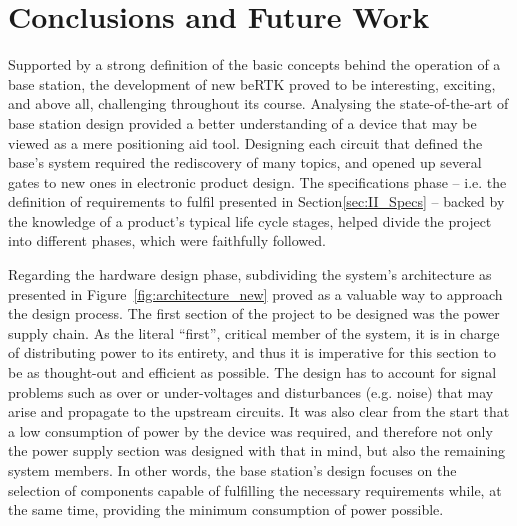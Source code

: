 

\chapter{Conclusions and Future Work}\label{cha:chapter6_ConclusionsFuture}


Supported by a strong definition of the basic concepts behind the operation of a base station, the development of new beRTK\textsuperscript{\textregistered} proved to be interesting, exciting, and above all, challenging throughout its course. Analysing the state-of-the-art of base station design provided a better understanding of a device that may be viewed as a mere positioning aid tool. Designing each circuit that defined the base's system required the rediscovery of many topics, and opened up several gates to new ones in electronic product design. The specifications phase -- i.e. the definition of requirements to fulfil presented in Section\ref{sec:II_Specs} -- backed by the knowledge of a product's typical life cycle stages, helped divide the project into different phases, which were faithfully followed.

Regarding the hardware design phase, subdividing the system's architecture as presented in Figure~\ref{fig:architecture_new} proved as a valuable way to approach the design process. The first section of the project to be designed was the power supply chain. As the literal ``first'', critical member of the system, it is in charge of distributing power to its entirety, and thus it is imperative for this section to be as thought-out and efficient as possible. The design has to account for signal problems such as over or under-voltages and disturbances (e.g. noise) that may arise and propagate to the upstream circuits. It was also clear from the start that a low consumption of power by the device was required, and therefore not only the power supply section was designed with that in mind, but also the remaining system members. In other words, the base station's design focuses on the selection of components capable of fulfilling the necessary requirements while, at the same time, providing the minimum consumption of power possible.

